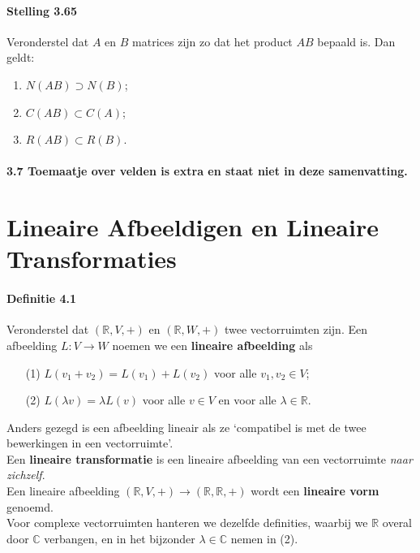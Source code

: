 \documentclass[11pt,oneside,a4paper]{article}
\begin{document}
	\paragraph{Stelling 3.65}
		Veronderstel dat $A$ en $B$ matrices zijn zo dat het product $AB$ bepaald is. Dan geldt:
		\begin{enumerate}
			\item $N(AB) \supset N(B)$;
			\item $C(AB) \subset C(A)$;
			\item $R(AB) \subset R(B)$.
		\end{enumerate}
	\paragraph{3.7 Toemaatje over velden is extra en staat niet in deze samenvatting.} 
		\phantom{d}
			
	\section{Lineaire Afbeeldigen en Lineaire Transformaties}
	
	\paragraph{Definitie 4.1}
		Veronderstel dat $(\mathbb{R}, V, +)$ en $(\mathbb{R}, W, +)$ twee vectorruimten zijn. Een afbeelding $L: V \to W$ noemen we een \textbf{lineaire afbeelding} als
		\begin{center}
			\begin{itemize}
				\item[(1)] $L(v_1+v_2) = L(v_1) +L(v_2)$ voor alle $v_1,v_2 \in V$;
				\item[(2)] $L(\lambda v) = \lambda L(v)$ voor alle $v\in V$ en voor alle $\lambda \in \mathbb{R}$. 
			\end{itemize}
		\end{center}
		Anders gezegd is een afbeelding lineair als ze `compatibel is met de twee bewerkingen in een vectorruimte'. \\ Een \textbf{lineaire transformatie} is een lineaire afbeelding van een vectorruimte \textit{naar zichzelf}. \\ Een lineaire afbeelding $(\mathbb{R}, V, +) \to (\mathbb{R}, \mathbb{R}, +)$ wordt een \textbf{lineaire vorm} genoemd. \\ Voor complexe vectorruimten hanteren we dezelfde definities, waarbij we $\mathbb{R}$ overal door $\mathbb{C}$ verbangen, en in het bijzonder $\lambda \in \mathbb{C}$ nemen in (2). 
\end{document}
